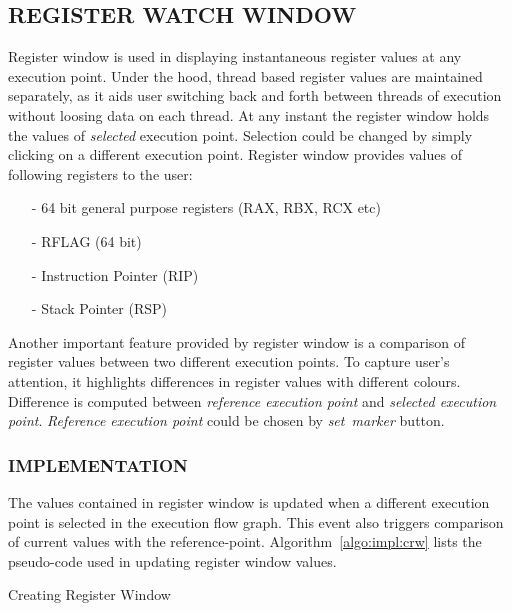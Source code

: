 \subsection {REGISTER WATCH WINDOW}
\label{sec:impl:rww}
Register window is used in displaying instantaneous register values at any execution point. Under the hood, thread based register values are maintained separately, as it aids user switching back and forth between threads of execution without loosing data on each thread. At any instant the register window holds the values of {\it selected} execution point. Selection could be changed by simply clicking on a different execution point. Register window provides values of following registers to the user:
\begin{itemize}
	\item[-] 64 bit general purpose registers (RAX, RBX, RCX etc)
	\item[-] RFLAG (64 bit)
	\item[-] Instruction Pointer (RIP)
	\item[-] Stack Pointer (RSP)
\end{itemize}

Another important feature provided by register window is a comparison of register values between two different execution points. To capture user's attention, it highlights differences in register values with different colours. Difference is computed between {\it reference execution point} and {\it selected execution point}. {\it Reference execution point} could be chosen by {\it set~marker} button.

\subsubsection{IMPLEMENTATION}

The values contained in register window is updated when a different execution point is selected in the execution flow graph. This event also triggers comparison of current values with the reference-point. Algorithm~\ref{algo:impl:crw} lists the pseudo-code used in updating register window values.

\IncMargin{1em}
\begin{algorithm}[h]
\DontPrintSemicolon
{} 
\BlankLine
{}
\caption{Creating Register Window}
\label{algo:impl:crw}
\end{algorithm}\DecMargin{1em}

